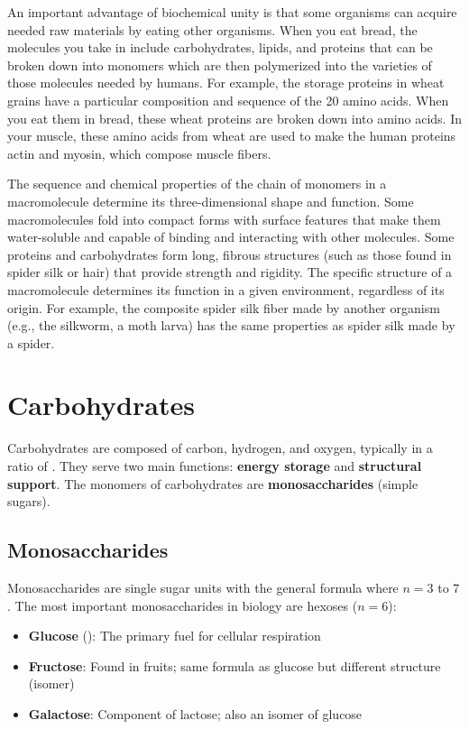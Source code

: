 \documentclass{report}
\begin{document}
An important advantage of biochemical unity is that some organisms can acquire needed raw materials by eating other organisms. When you eat bread, the molecules you take in include carbohydrates, lipids, and proteins that can be broken down into monomers which are then polymerized into the varieties of those molecules needed by humans. For example, the storage proteins in wheat grains have a particular composition and sequence of the 20 amino acids. When you eat them in bread, these wheat proteins are broken down into amino acids. In your muscle, these amino acids from wheat are used to make the human proteins actin and myosin, which compose muscle fibers.

The sequence and chemical properties of the chain of monomers in a macromolecule determine its three-dimensional shape and function. Some macromolecules fold into compact forms with surface features that make them water-soluble and capable of binding and interacting with other molecules. Some proteins and carbohydrates form long, fibrous structures (such as those found in spider silk or hair) that provide strength and rigidity. The specific structure of a macromolecule determines its function in a given environment, regardless of its origin. For example, the composite spider silk fiber made by another organism (e.g., the silkworm, a moth larva) has the same properties as spider silk made by a spider.

\section{Carbohydrates}

Carbohydrates are composed of carbon, hydrogen, and oxygen, typically in a ratio of . They serve two main functions: \textbf{energy storage} and \textbf{structural support}. The monomers of carbohydrates are \textbf{monosaccharides} (simple sugars).

\subsection{Monosaccharides}

Monosaccharides are single sugar units with the general formula  where \(n = 3\) to \(7\). The most important monosaccharides in biology are hexoses (\(n = 6\)):
\begin{itemize}
    \item \textbf{Glucose} (): The primary fuel for cellular respiration
    \item \textbf{Fructose}: Found in fruits; same formula as glucose but different structure (isomer)
    \item \textbf{Galactose}: Component of lactose; also an isomer of glucose
\end{itemize}
\end{document}
